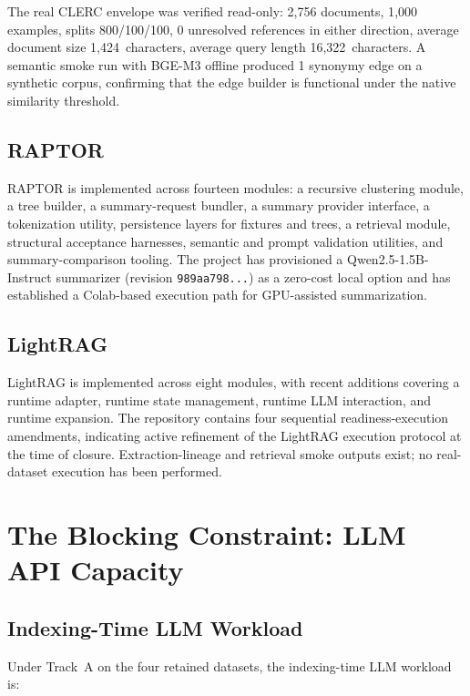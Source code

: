 \documentclass[11pt,a4paper]{article}
\begin{document}
The real CLERC envelope was verified read-only: 2{,}756 documents, 1{,}000 examples, splits 800/100/100, 0 unresolved references in either direction, average document size 1{,}424~characters, average query length 16{,}322~characters. A semantic smoke run with BGE-M3 offline produced 1 synonymy edge on a synthetic corpus, confirming that the edge builder is functional under the native similarity threshold.

\subsection{RAPTOR}

RAPTOR is implemented across fourteen modules: a recursive clustering module, a tree builder, a summary-request bundler, a summary provider interface, a tokenization utility, persistence layers for fixtures and trees, a retrieval module, structural acceptance harnesses, semantic and prompt validation utilities, and summary-comparison tooling. The project has provisioned a Qwen2.5-1.5B-Instruct summarizer (revision \texttt{989aa798...}) as a zero-cost local option and has established a Colab-based execution path for GPU-assisted summarization.

\subsection{LightRAG}

LightRAG is implemented across eight modules, with recent additions covering a runtime adapter, runtime state management, runtime LLM interaction, and runtime expansion. The repository contains four sequential readiness-execution amendments, indicating active refinement of the LightRAG execution protocol at the time of closure. Extraction-lineage and retrieval smoke outputs exist; no real-dataset execution has been performed.

\section{The Blocking Constraint: LLM API Capacity}
\label{sec:block}

\subsection{Indexing-Time LLM Workload}

Under Track~A on the four retained datasets, the indexing-time LLM workload is:
\end{document}
